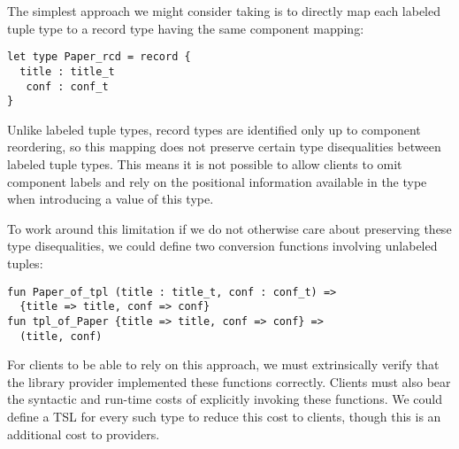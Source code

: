 The simplest approach we might consider taking is to directly map each labeled tuple type to a record type having the same component mapping:
\begin{lstlisting}[numbers=none]
let type Paper_rcd = record {
  title : title_t
   conf : conf_t 
}\end{lstlisting}
Unlike labeled tuple types, record types are identified only up to component reordering, so this mapping does not preserve certain type disequalities between labeled tuple types. This means it is not  possible to allow clients to omit component labels and rely on the positional information available in the type when introducing a value of this type.%

To work around this limitation if we do not otherwise care about preserving these type disequalities, we could define two conversion functions involving unlabeled tuples:
\begin{lstlisting}[numbers=none]
fun Paper_of_tpl (title : title_t, conf : conf_t) => 
  {title => title, conf => conf}
fun tpl_of_Paper {title => title, conf => conf} =>
  (title, conf)
\end{lstlisting}
For clients to be able to rely on this approach, we must extrinsically verify that the library provider implemented these functions correctly. Clients must also bear the syntactic and run-time costs of explicitly invoking these functions. We could define a TSL for every such type to reduce this cost to clients, though this is an additional cost to providers.  %

